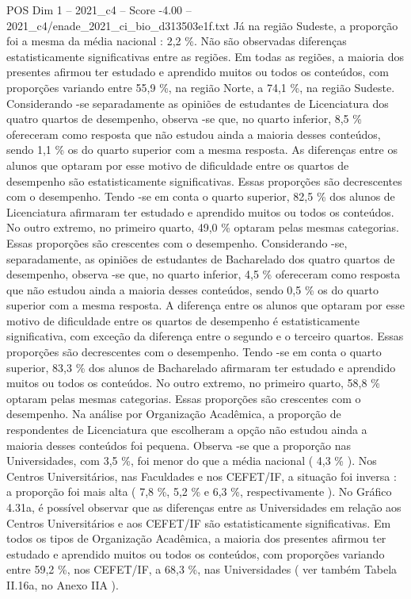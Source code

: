 \begin{textsample}{POS Dim 1 – 2021\_c4 – Score -4.00 – 2021\_c4/enade\_2021\_ci\_bio\_d313503e1f.txt}
Já na região Sudeste, a proporção foi a mesma da média nacional : 2,2 \%.
Não são observadas diferenças estatisticamente significativas entre as regiões.
Em todas as regiões, a maioria dos presentes afirmou ter estudado e aprendido muitos ou todos os conteúdos, com proporções variando entre 55,9 \%, na região Norte, a 74,1 \%, na região Sudeste.
Considerando -se separadamente as opiniões de estudantes de Licenciatura dos quatro quartos de desempenho, observa -se que, no quarto inferior, 8,5 \% ofereceram como resposta que não estudou ainda a maioria desses conteúdos, sendo 1,1 \% os do quarto superior com a mesma resposta.
As diferenças entre os alunos que optaram por esse motivo de dificuldade entre os quartos de desempenho são estatisticamente significativas.
Essas proporções são decrescentes com o desempenho.
Tendo -se em conta o quarto superior, 82,5 \% dos alunos de Licenciatura afirmaram ter estudado e aprendido muitos ou todos os conteúdos.
No outro extremo, no primeiro quarto, 49,0 \% optaram pelas mesmas categorias.
Essas proporções são crescentes com o desempenho.
Considerando -se, separadamente, as opiniões de estudantes de Bacharelado dos quatro quartos de desempenho, observa -se que, no quarto inferior, 4,5 \% ofereceram como resposta que não estudou ainda a maioria desses conteúdos, sendo 0,5 \% os do quarto superior com a mesma resposta.
A diferença entre os alunos que optaram por esse motivo de dificuldade entre os quartos de desempenho é estatisticamente significativa, com exceção da diferença entre o segundo e o terceiro quartos.
Essas proporções são decrescentes com o desempenho.
Tendo -se em conta o quarto superior, 83,3 \% dos alunos de Bacharelado afirmaram ter estudado e aprendido muitos ou todos os conteúdos.
No outro extremo, no primeiro quarto, 58,8 \% optaram pelas mesmas categorias.
Essas proporções são crescentes com o desempenho.
Na análise por Organização Acadêmica, a proporção de respondentes de Licenciatura que escolheram a opção não estudou ainda a maioria desses conteúdos foi pequena.
Observa -se que a proporção nas Universidades, com 3,5 \%, foi menor do que a média nacional ( 4,3 \% ).
Nos Centros Universitários, nas Faculdades e nos CEFET/IF, a situação foi inversa : a proporção foi mais alta ( 7,8 \%, 5,2 \% e 6,3 \%, respectivamente ).
No Gráfico 4.31a, é possível observar que as diferenças entre as Universidades em relação aos Centros Universitários e aos CEFET/IF são estatisticamente significativas.
Em todos os tipos de Organização Acadêmica, a maioria dos presentes afirmou ter estudado e aprendido muitos ou todos os conteúdos, com proporções variando entre 59,2 \%, nos CEFET/IF, a 68,3 \%, nas Universidades ( ver também Tabela II.16a, no Anexo IIA ).

\end{textsample}
